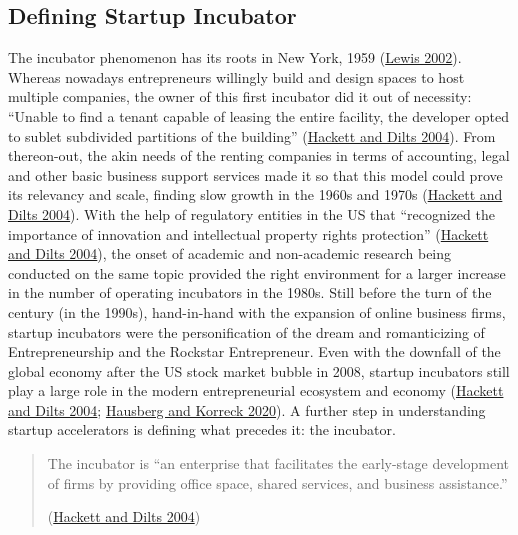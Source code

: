 \documentclass[
  12pt,
]{article}
\begin{document}
\hypertarget{defining-startup-incubator}{%
\subsection{Defining Startup Incubator}\label{defining-startup-incubator}}

The incubator phenomenon has its roots in New York, 1959 (\protect\hyperlink{ref-lewis_does_2002}{Lewis 2002}). Whereas nowadays entrepreneurs willingly build and design spaces to host multiple companies, the owner of this first incubator did it out of necessity: ``Unable to find a tenant capable of leasing the entire facility, the developer opted to sublet subdivided partitions of the building'' (\protect\hyperlink{ref-hackett_systematic_2004}{Hackett and Dilts 2004}). From thereon-out, the akin needs of the renting companies in terms of accounting, legal and other basic business support services made it so that this model could prove its relevancy and scale, finding slow growth in the 1960s and 1970s (\protect\hyperlink{ref-hackett_systematic_2004}{Hackett and Dilts 2004}). With the help of regulatory entities in the US that ``recognized the importance of innovation and intellectual property rights protection'' (\protect\hyperlink{ref-hackett_systematic_2004}{Hackett and Dilts 2004}), the onset of academic and non-academic research being conducted on the same topic provided the right environment for a larger increase in the number of operating incubators in the 1980s. Still before the turn of the century (in the 1990s), hand-in-hand with the expansion of online business firms, startup incubators were the personification of the dream and romanticizing of Entrepreneurship and the Rockstar Entrepreneur. Even with the downfall of the global economy after the US stock market bubble in 2008, startup incubators still play a large role in the modern entrepreneurial ecosystem and economy (\protect\hyperlink{ref-hackett_systematic_2004}{Hackett and Dilts 2004}; \protect\hyperlink{ref-hausberg_business_2020}{Hausberg and Korreck 2020}). A further step in understanding startup accelerators is defining what precedes it: the incubator.

\begin{quote}
The incubator is ``an enterprise that facilitates the early-stage development of firms by providing office space, shared services, and business assistance.''

(\protect\hyperlink{ref-hackett_systematic_2004}{Hackett and Dilts 2004})
\end{quote}
\end{document}
